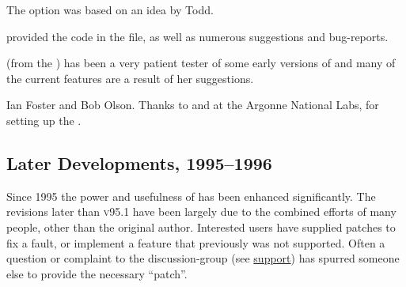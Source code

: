 \begin{htmllist}
\item [\ToddLittle]
The  option was based on an idea by Todd.


\item [\AxelBelinfante]
provided the \Perl{} code in the  file, 
as well as numerous suggestions and bug-reports. 

\item [\VerenaUmar] (from the \CSEP) 
has been a very patient tester of some early versions of \latextohtml{}
and many of the current features are a result of her suggestions. 

%

\item [Ian Foster and Bob Olson.]
Thanks to \IanFoster{} and \BobOlson{} at the Argonne National Labs, 
for setting up the \maillist.
\end{htmllist}


\subsection*{Later Developments, 1995--1996\label{recent96}}%
%
Since 1995 the power and usefulness of \latextohtml{} has been enhanced significantly.
The revisions later than \textsc{v95.1} have been largely due 
to the combined efforts of many people, other than the original author.
Interested users have supplied patches to fix a fault, 
or implement a feature that previously was not supported. 
Often a question or complaint to the discussion-group 
(see \hyperref{Getting Support ...}{Section~}{}{support})
has spurred someone else to provide the necessary ``patch''.%

